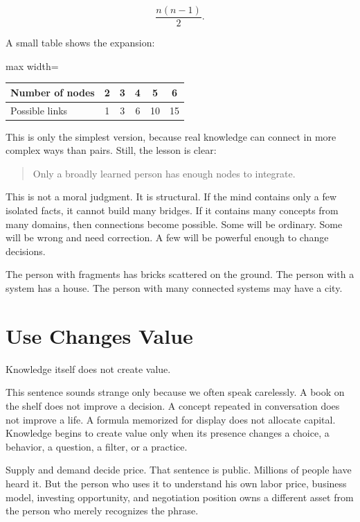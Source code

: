 \[
\frac{n(n-1)}{2}.
\]

A small table shows the expansion:

\begin{center}
\begin{adjustbox}{max width=\linewidth}
\begin{tabular}{lccccc}
\hline
Number of nodes & 2 & 3 & 4 & 5 & 6 \\
\hline
Possible links & 1 & 3 & 6 & 10 & 15 \\
\hline
\end{tabular}
\end{adjustbox}
\end{center}

This is only the simplest version, because real knowledge can connect in more complex ways than pairs. Still, the lesson is clear:

\begin{quote}
Only a broadly learned person has enough nodes to integrate.
\end{quote}

This is not a moral judgment. It is structural. If the mind contains only a few isolated facts, it cannot build many bridges. If it contains many concepts from many domains, then connections become possible. Some will be ordinary. Some will be wrong and need correction. A few will be powerful enough to change decisions.

The person with fragments has bricks scattered on the ground. The person with a system has a house. The person with many connected systems may have a city.

\section*{Use Changes Value}

Knowledge itself does not create value.

This sentence sounds strange only because we often speak carelessly. A book on the shelf does not improve a decision. A concept repeated in conversation does not improve a life. A formula memorized for display does not allocate capital. Knowledge begins to create value only when its presence changes a choice, a behavior, a question, a filter, or a practice.

Supply and demand decide price. That sentence is public. Millions of people have heard it. But the person who uses it to understand his own labor price, business model, investing opportunity, and negotiation position owns a different asset from the person who merely recognizes the phrase.

